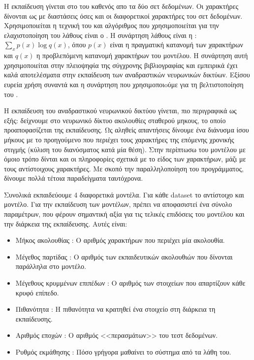 Η εκπαίδευση γίνεται στο  του καθενός απο τα δύο σετ δεδομένων. 
Οι χαρακτήρες δίνονται ως  με διαστάσεις όσες και οι διαφορετικοί χαρακτήρες του σετ δεδομένων.
Χρησιμοποιείται η τεχνική του  και αλγόριθμος που χρησιμοποιείται για την ελαχιστοποίηση του λάθους είναι ο .
Η συνάρτηση λάθους είναι η : $\sum_x p(x) \log{q(x)}$, όπου $p(x)$ είναι η πραγματική κατανομή των χαρακτήρων και $q(x)$ η προβλεπόμενη κατανομή χαρακτήρων του μοντέλου.
Η συνάρτηση αυτή χρησιμοποιείται στην πλειοψηφία της σύγχρονης βιβλιογραφίας και εμπειρικά έχει καλά αποτελέσματα στην εκπαίδευση των αναδραστικών νευρωνικών δικτύων.
Εξίσου ευρεία χρήση συναντά και η συνάρτηση  που χρησιμοποιoύμε για τη βελτιστοποίηση του .


Η εκπαίδευση του αναδραστικού νευρωνικού δικτύου γίνεται, πιο περιγραφικά ως εξής: δείχνουμε στο νευρωνικό δίκτυο ακολουθίες σταθερού μηκους, το οποίο προαποφασίζεται της εκπαίδευσης.
Ως αληθείς απαντήσεις δίνουμε ένα διάνυσμα ίσου μήκους με το προηγούμενο που περιέχει τους χαρακτήρες της επόμενης χρονικής στιγμής (κύλιση του διανύσματος κατά μία θέση).
Στην περίπτωσω του μοντέλου   με όμοιο τρόπο δίνται και οι πληροφορίες σχετικά με το είδος των χαρακτήρων, μάζι με τους αντίστοιχους χαρακτήρες.
Με σκοπό την παραλληλοποίηση του προγράμματος, δίνουμε πολλά τέτοια παραδείγματα ταυτόχρονα.

Συνολικά εκπαιδεύουμε 4 διαφορετικά μοντέλα. Για κάθε dataset το αντίστοιχο  και  μοντέλο.
Για την εκπαίδευση των μοντέλων, πρέπει να αποφασιστεί ένα σύνολο παραμέτρων, που φέρουν σημαντική αξία για τις τελικές επιδόσεις του μοντέλου και την διάρκεια της εκπαίδευσης. Αυτές είναι:

\begin{itemize} 
\item Μήκος ακολουθίας : Ο αριθμός χαρακτήρων που περιέχει μία ακολουθία.
\item Μέγεθος παρτίδας : Ο αριθμός των εκπαιδευτικών ακολουθιών που δίνονται παράλληλα στο μοντέλο.
\item Μέγεθους κρυμμένων επιπέδων : Ο αριθμός των στοιχείων  που απαρτίζουν κάθε κρυφό επίπεδο.
\item Πιθανότητα : Η πιθανότητα να κρατηθεί ένα στοιχείο στη διάρκεια τη εκπαίδευσης.
\item Αριθμός εποχών : Ο αριθμός <<περασμάτων>> του τεστ δεδομένων.
\item Ρυθμός εκμάθησης : Πόσο γρήγορα μαθαίνει το σύστημα από τα λάθη του.

\end{itemize}


